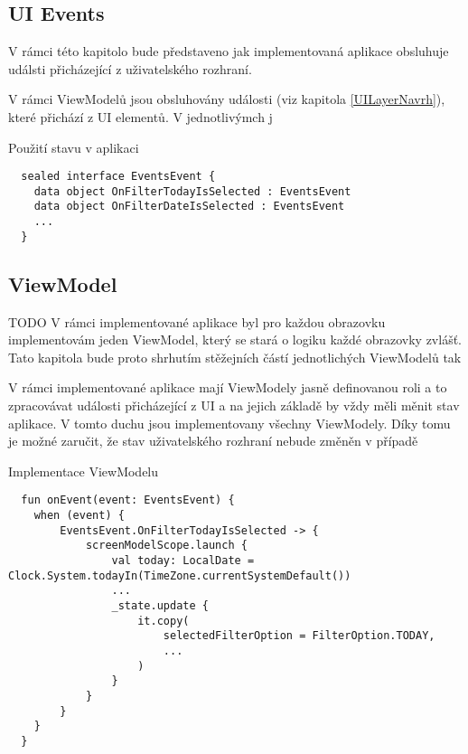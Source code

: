 \subsection{UI Events} \label{eventHandlingImpl}
V rámci této kapitolo bude představeno jak implementovaná aplikace obsluhuje událsti přicházející z uživatelského rozhraní.


V rámci ViewModelů jsou obsluhovány události (viz kapitola \ref{UILayerNavrh}), které přichází z UI elementů. V jednotlivýmch j


\begin{listing}[H]
\caption{Použití stavu v aplikaci}\label{lst:StateImpl}
\begin{verbatim}
  sealed interface EventsEvent {
    data object OnFilterTodayIsSelected : EventsEvent
    data object OnFilterDateIsSelected : EventsEvent
    ...
  }
\end{verbatim}
\end{listing}

\subsection{ViewModel} \label{ViewModelImpl}
TODO %
V rámci implementované aplikace byl pro každou obrazovku implementovám jeden ViewModel, který se stará o logiku každé obrazovky zvlášť. Tato kapitola 
bude proto shrhutím stěžejních částí jednotlichých ViewModelů tak 


V rámci implementované aplikace mají ViewModely jasně definovanou roli a to zpracovávat události přicházející z UI a na jejich základě by vždy měli
měnit stav aplikace. V tomto duchu jsou implementovany všechny ViewModely. Díky tomu je možné zaručit, že stav uživatelského rozhraní  nebude změněn
v případě 
\begin{listing}[H]
\caption{Implementace ViewModelu}\label{lst:ViewModelImpl}
\begin{verbatim}
  fun onEvent(event: EventsEvent) {
    when (event) {
        EventsEvent.OnFilterTodayIsSelected -> {
            screenModelScope.launch {
                val today: LocalDate = Clock.System.todayIn(TimeZone.currentSystemDefault())
                ...
                _state.update {
                    it.copy(
                        selectedFilterOption = FilterOption.TODAY,
                        ...
                    )
                }
            }
        }
    }
  }
\end{verbatim}
\end{listing}

